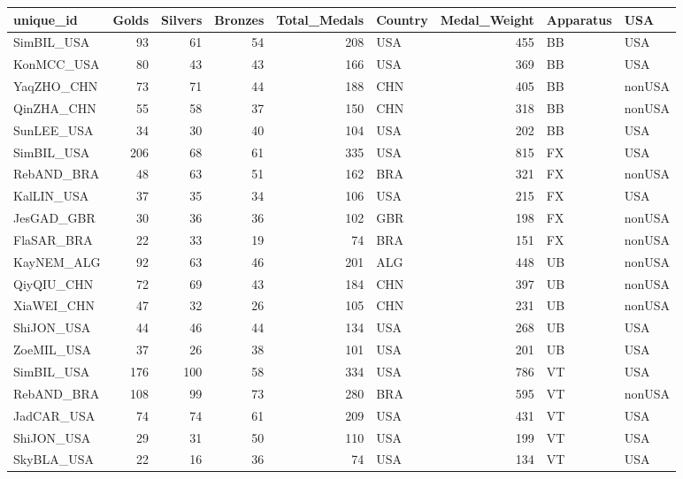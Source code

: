 \documentclass[
  letterpaper,
  DIV=11,
  numbers=noendperiod]{scrartcl}
\begin{document}
\begin{tabular}{l|r|r|r|r|l|r|l|l}
\hline
unique\_id & Golds & Silvers & Bronzes & Total\_Medals & Country & Medal\_Weight & Apparatus & USA\\
\hline
SimBIL\_USA & 93 & 61 & 54 & 208 & USA & 455 & BB & USA\\
\hline
KonMCC\_USA & 80 & 43 & 43 & 166 & USA & 369 & BB & USA\\
\hline
YaqZHO\_CHN & 73 & 71 & 44 & 188 & CHN & 405 & BB & nonUSA\\
\hline
QinZHA\_CHN & 55 & 58 & 37 & 150 & CHN & 318 & BB & nonUSA\\
\hline
SunLEE\_USA & 34 & 30 & 40 & 104 & USA & 202 & BB & USA\\
\hline
SimBIL\_USA & 206 & 68 & 61 & 335 & USA & 815 & FX & USA\\
\hline
RebAND\_BRA & 48 & 63 & 51 & 162 & BRA & 321 & FX & nonUSA\\
\hline
KalLIN\_USA & 37 & 35 & 34 & 106 & USA & 215 & FX & USA\\
\hline
JesGAD\_GBR & 30 & 36 & 36 & 102 & GBR & 198 & FX & nonUSA\\
\hline
FlaSAR\_BRA & 22 & 33 & 19 & 74 & BRA & 151 & FX & nonUSA\\
\hline
KayNEM\_ALG & 92 & 63 & 46 & 201 & ALG & 448 & UB & nonUSA\\
\hline
QiyQIU\_CHN & 72 & 69 & 43 & 184 & CHN & 397 & UB & nonUSA\\
\hline
XiaWEI\_CHN & 47 & 32 & 26 & 105 & CHN & 231 & UB & nonUSA\\
\hline
ShiJON\_USA & 44 & 46 & 44 & 134 & USA & 268 & UB & USA\\
\hline
ZoeMIL\_USA & 37 & 26 & 38 & 101 & USA & 201 & UB & USA\\
\hline
SimBIL\_USA & 176 & 100 & 58 & 334 & USA & 786 & VT & USA\\
\hline
RebAND\_BRA & 108 & 99 & 73 & 280 & BRA & 595 & VT & nonUSA\\
\hline
JadCAR\_USA & 74 & 74 & 61 & 209 & USA & 431 & VT & USA\\
\hline
ShiJON\_USA & 29 & 31 & 50 & 110 & USA & 199 & VT & USA\\
\hline
SkyBLA\_USA & 22 & 16 & 36 & 74 & USA & 134 & VT & USA\\
\hline
\end{tabular}
\end{document}
